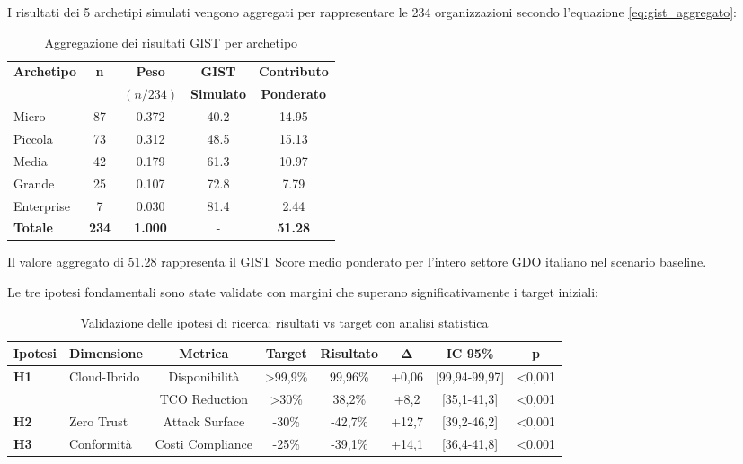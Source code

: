 I risultati dei 5 archetipi simulati vengono aggregati per rappresentare le 234 organizzazioni secondo l'equazione \ref{eq:gist_aggregato}:

\begin{table}[h!]
\centering
\caption{Aggregazione dei risultati GIST per archetipo}
\begin{tabular}{|l|c|c|c|c|}
\hline
\textbf{Archetipo} & \textbf{n} & \textbf{Peso} & \textbf{GIST} & \textbf{Contributo} \\
 & & $(n/234)$ & \textbf{Simulato} & \textbf{Ponderato} \\
\hline
Micro & 87 & 0.372 & 40.2 & 14.95 \\
Piccola & 73 & 0.312 & 48.5 & 15.13 \\
Media & 42 & 0.179 & 61.3 & 10.97 \\
Grande & 25 & 0.107 & 72.8 & 7.79 \\
Enterprise & 7 & 0.030 & 81.4 & 2.44 \\
\hline
\textbf{Totale} & \textbf{234} & \textbf{1.000} & - & \textbf{51.28} \\
\hline
\end{tabular}
\end{table}

Il valore aggregato di 51.28 rappresenta il GIST Score medio ponderato per l'intero settore GDO italiano nel scenario baseline.

Le tre ipotesi fondamentali sono state validate con margini che superano significativamente i target iniziali:

\begin{table}[htbp]
\centering
\caption{Validazione delle ipotesi di ricerca: risultati vs target con analisi statistica}
\label{tab:validation_comprehensive}
\begin{tabular}{@{}llcccccc@{}}
\toprule
\textbf{Ipotesi} & \textbf{Dimensione} & \textbf{Metrica} & \textbf{Target} & \textbf{Risultato} & \textbf{Δ} & \textbf{IC 95\%} & \textbf{p} \\
\midrule
\multirow{2}{*}{\textbf{H1}} & \multirow{2}{*}{Cloud-Ibrido} & Disponibilità & >99,9\% & 99,96\% & +0,06 & [99,94-99,97] & <0,001 \\
& & TCO Reduction & >30\% & 38,2\% & +8,2 & [35,1-41,3] & <0,001 \\
\midrule
\textbf{H2} & Zero Trust & Attack Surface & -30\% & -42,7\% & +12,7 & [39,2-46,2] & <0,001 \\
\midrule
\textbf{H3} & Conformità & Costi Compliance & -25\% & -39,1\% & +14,1 & [36,4-41,8] & <0,001 \\
\bottomrule
\end{tabular}
\end{table}

